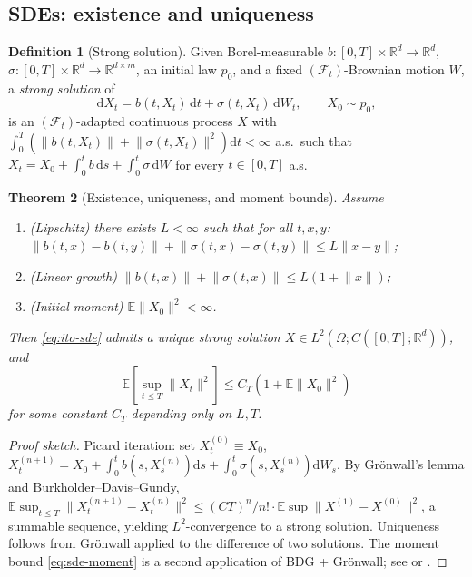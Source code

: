 \documentclass[11pt,letterpaper]{article}
\theoremstyle{plain}
\newtheorem{theorem}{Theorem}[section]
\theoremstyle{definition}
\newtheorem{definition}[theorem]{Definition}
\theoremstyle{remark}
\newcommand{\R}{\mathbb{R}}
\newcommand{\E}{\mathbb{E}}
\newcommand{\dd}{\mathrm{d}}
\newcommand{\calF}{\mathcal{F}}
\newcommand{\norm}[1]{\lVert #1\rVert}
\begin{document}
\subsection{SDEs: existence and uniqueness}

\begin{definition}[Strong solution]\label{def:strong}
Given Borel-measurable $b:[0,T]\times\R^d\to\R^d$,
$\sigma:[0,T]\times\R^d\to\R^{d\times m}$, an initial law $p_0$, and a
fixed $(\calF_t)$-Brownian motion $W$, a \emph{strong solution} of
\begin{equation}
  \dd X_t = b(t,X_t)\,\dd t + \sigma(t,X_t)\,\dd W_t,\qquad X_0\sim p_0,
  \label{eq:ito-sde}
\end{equation}
is an $(\calF_t)$-adapted continuous process $X$ with
$\int_0^T(\norm{b(t,X_t)}+\norm{\sigma(t,X_t)}^2)\dd t<\infty$ a.s.\ such
that $X_t=X_0+\int_0^t b\,\dd s+\int_0^t\sigma\,\dd W$ for every
$t\in[0,T]$ a.s.
\end{definition}

\begin{theorem}[Existence, uniqueness, and moment bounds]\label{thm:sde}
Assume
\begin{enumerate}[label=(\roman*),leftmargin=*,itemsep=1pt]
  \item \textup{(Lipschitz)} there exists $L<\infty$ such that for all
        $t,x,y$: $\norm{b(t,x)-b(t,y)}+\norm{\sigma(t,x)-\sigma(t,y)}\le L\norm{x-y}$;
  \item \textup{(Linear growth)} $\norm{b(t,x)}+\norm{\sigma(t,x)}\le L(1+\norm{x})$;
  \item \textup{(Initial moment)} $\E\norm{X_0}^2<\infty$.
\end{enumerate}
Then \eqref{eq:ito-sde} admits a unique strong solution $X\in
L^2(\Omega;C([0,T];\R^d))$, and
\begin{equation}
  \E\!\left[\sup_{t\le T}\norm{X_t}^2\right]
  \le C_T(1+\E\norm{X_0}^2)
  \label{eq:sde-moment}
\end{equation}
for some constant $C_T$ depending only on $L,T$.
\end{theorem}
\begin{proof}[Proof sketch]
Picard iteration: set $X^{(0)}_t\equiv X_0$,
$X^{(n+1)}_t=X_0+\int_0^tb(s,X^{(n)}_s)\dd s+\int_0^t\sigma(s,X^{(n)}_s)\dd W_s$.
By Gr\"onwall's lemma and Burkholder--Davis--Gundy,
$\E\sup_{t\le T}\norm{X^{(n+1)}_t-X^{(n)}_t}^2\le(CT)^n/n!\cdot\E\sup\norm{X^{(1)}-X^{(0)}}^2$,
a summable sequence, yielding $L^2$-convergence to a strong solution.
Uniqueness follows from Gr\"onwall applied to the difference of two
solutions. The moment bound \eqref{eq:sde-moment} is a second application
of BDG + Gr\"onwall; see \citep[Thm.~5.2.1, Thm.~5.2.9]{oksendal2003sde} or
\citep[Thm.~2.9]{karatzas1991bm}.
\end{proof}
\end{document}
